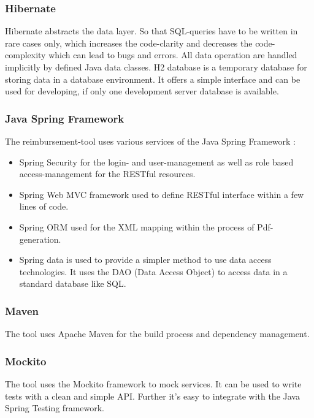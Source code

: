 \subsubsection{Hibernate}
Hibernate abstracts the data layer. So that SQL-queries have to be written in rare cases only, which increases the code-clarity and decreases the code-complexity which can lead to bugs and errors. All data operation are handled implicitly by defined Java data classes.\newline
H2 database is a temporary database for storing data in a database environment. It offers a simple interface and can be used for developing, if only one development server database is available. \cite{hibernate}

\subsubsection{Java Spring Framework}
The reimbursement-tool uses various services of the Java Spring Framework \cite{spring}:
\begin{itemize}
    \item Spring Security for the login- and user-management as well as role based access-management for the RESTful resources.
    \item Spring Web MVC framework used to define RESTful interface within a few lines of code.
    \item Spring ORM used for the XML mapping within the process of Pdf-generation.
    \item Spring data is used to provide a simpler method to use data access technologies. It uses the DAO (Data Access Object) \cite{dao} to access data in a standard database like SQL. 
\end{itemize}

\subsubsection{Maven}
The tool uses Apache Maven \cite{maven} for the build process and dependency management.  

\subsubsection{Mockito}
The tool uses the Mockito framework to mock services. It can be used to write tests with a clean and simple API. Further it's easy to integrate with the Java Spring Testing framework. \cite{mockito}

